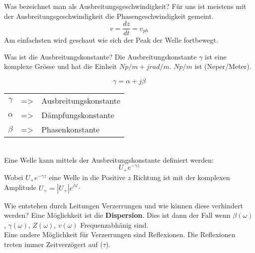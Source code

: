 \begin{karte}{Was bezeichnet man als Ausbreitungsgeschwindigkeit?}
	Für uns ist meistens mit der Ausbreitungsgeschwindigkeit die Phasengeschwindigkeit gemeint.
	\begin{equation*}
		v = \frac{dz}{dt} = v_{ph} 
	\end{equation*}
	Am einfachsten wird geschaut wie sich der Peak der Welle fortbewegt.
	\vspace{-10pt}
	\begin{figure}[h]
		\centering
		
	\end{figure}
\end{karte}

\begin{karte}{Was ist die Ausbreitungskonstante?}
	Die Ausbreitungskonstante $\gamma$ ist eine komplexe Grösse und hat die Einheit $Np/m + jrad/m$. $Np/m$ ist (Neper/Meter).\\[7pt]
	\begin{minipage}[c]{0.38\textwidth}
		\begin{equation*}
		\gamma = \alpha + j \beta
		\end{equation*}
	\end{minipage}
	\begin{minipage}[t]{0.68\textwidth}
		\begin{tabular}{ccl}
			$\gamma$ & => & Ausbreitungskonstante\\
			$\alpha$ & => & Dämpfungskonstante\\
			$\beta$  & => & Phasenkonstante
		\end{tabular}
	\end{minipage}\\[7pt]
	
	Eine Welle kann mittels der Ausbreitungskonstante definiert werden:
	\begin{equation*}
		U_+ e^{-\gamma z}
	\end{equation*}
	Wobei $U_+ e^{-\gamma z}$ eine Welle in die Positive $z$ Richtung ist mit der komplexen Amplitude $U_+=|U_+| e^{j \varphi_+}$
\end{karte}

\begin{karte}{Wie entstehen durch Leitungen Verzerrungen und wie können diese verhindert werden?}
	Eine Möglichkeit ist die \textbf{Dispersion}. Dies ist dann der Fall wenn $\beta(\omega)$, $\gamma(\omega)$, $Z(\omega)$, $v(\omega)$ Frequenzabhänig sind.\\
	Eine andere Möglichkeit für Verzerrungen sind Reflexionen. Die Reflexionen treten immer Zeitverzögert auf ($\tau$).\\
	\scalebox{.8}{}
\end{karte}

